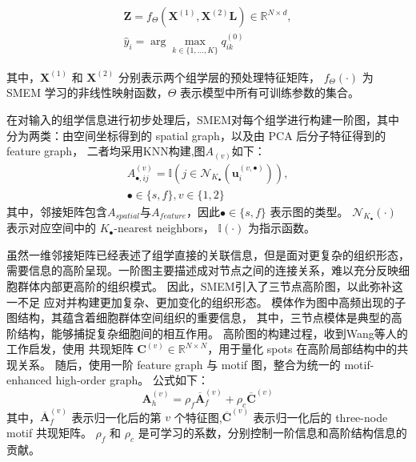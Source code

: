 \documentclass[journal]{IEEEtran}
\begin{document}
\begin{equation}
\label{1}
\begin{aligned}
\mathbf{Z}=f_{\Theta}\left(\mathbf{X}^{(1)},\mathbf{X}^{(2)}
\mathbf{L}\right)\in\mathbb{R}^{N\times d} ,\\
\widehat{y}_i=\arg\max_{k\in\{1,\ldots,K\}} q_{ik}^{(0)}
\end{aligned}
\end{equation}

其中，$\mathbf{X}^{(1)}$ 和 $\mathbf{X}^{(2)}$ 分别表示两个组学层的预处理特征矩阵，
$f_{\Theta}(\cdot)$ 为 SMEM 学习的非线性映射函数，$\Theta$ 表示模型中所有可训练参数的集合。

在对输入的组学信息进行初步处理后，SMEM对每个组学进行构建一阶图，其中分为两类：由空间坐标得到的 spatial graph，以及由 PCA 后分子特征得到的 feature graph，
二者均采用KNN构建,图$A_{(v)}$如下：
\begin{equation}
    \begin{aligned}
A_{\bullet,ij}^{(v)}=
\mathbb{I}\left(j\in\mathcal{N}_{K_{\bullet}}(\mathbf{u}_i^{(v,\bullet)})\right),\\
\bullet\in\{s,f\}, v\in\{1,2\}
    \end{aligned}
\end{equation}
其中，邻接矩阵包含$A_{spatial}$与$A_{feature}$，因此$\bullet\in\{s,f\}$ 表示图的类型。
$\mathcal{N}_{K_{\bullet}}(\cdot)$ 表示对应空间中的 $K_{\bullet}$-nearest neighbors，
$\mathbb{I}(\cdot)$ 为指示函数。

虽然一维邻接矩阵已经表述了组学直接的关联信息，但是面对更复杂的组织形态，需要信息的高阶呈现。一阶图主要描述成对节点之间的连接关系，难以充分反映细胞群体内部更高阶的组织模式。
因此，SMEM引入了三节点高阶图，以此弥补这一不足
应对并构建更加复杂、更加变化的组织形态。
模体\cite{}作为图中高频出现的子图结构，其蕴含着细胞群体空间组织的重要信息，
其中，三节点模体是典型的高阶结构，能够捕捉复杂细胞间的相互作用。
高阶图的构建过程，收到Wang等人的工作\cite{Wang2023}启发，使用
共现矩阵 $\mathbf{C}^{(v)}\in\mathbb{R}^{N\times N}$，用于量化 spots 在高阶局部结构中的共现关系。
随后，使用一阶 feature graph 与 motif 图，整合为统一的 motif-enhanced high-order graph。
公式如下：
\begin{equation}
\mathbf{A}_{h}^{(v)}=\rho_f\overline{\mathbf{A}}_{f}^{(v)}+\rho_c\overline{\mathbf{C}}^{(v)}
\end{equation}
其中，$\overline{\mathbf{A}}_{f}^{(v)}$ 表示归一化后的第 $v$ 个特征图,$\overline{\mathbf{C}}^{(v)}$ 表示归一化后的 three-node motif 共现矩阵。
$\rho_f$ 和 $\rho_c$ 是可学习的系数，分别控制一阶信息和高阶结构信息的贡献。
\end{document}

